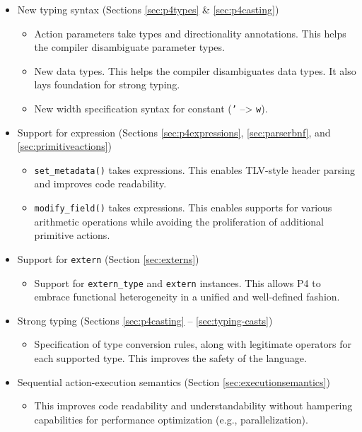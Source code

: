 \documentclass[12pt]{article}
\begin{document}
\begin{itemize}

\item New typing syntax (Sections \ref{sec:p4types} \& \ref{sec:p4casting})
  \begin{itemize}
  \item Action parameters take types and directionality annotations. 
  This helps the compiler disambiguate parameter types.
  \item New data types. This helps the compiler disambiguates data types. 
  It also lays foundation for strong typing.
  \item New width specification syntax for constant (\texttt{'} --> \texttt{w}).
  \end{itemize}

\item Support for expression (Sections \ref{sec:p4expressions}, 
\ref{sec:parserbnf}, and \ref{sec:primitiveactions})
  \begin{itemize}
  \item \texttt{set_metadata()} takes expressions. 
  This enables TLV-style header parsing and improves code readability.
  \item \texttt{modify_field()} takes expressions. 
  This enables supports for various arithmetic operations while avoiding
  the proliferation of additional primitive actions.
  \end{itemize}

\item Support for \texttt{extern} (Section \ref{sec:externs})
  \begin{itemize}
  \item Support for \texttt{extern_type} and \texttt{extern} instances.
  This allows P4 to embrace functional heterogeneity in a unified and well-defined
  fashion.
  \end{itemize}

\item Strong typing (Sections \ref{sec:p4casting} -- \ref{sec:typing-casts})
  \begin{itemize}
  \item Specification of type conversion rules, along with legitimate operators 
  for each supported type. This improves the safety of the language.
  \end{itemize}

\item Sequential action-execution semantics (Section \ref{sec:executionsemantics})
  \begin{itemize}
  \item This improves code readability and understandability without 
  hampering capabilities for performance optimization (e.g., parallelization).
  \end{itemize}


\end{itemize}
\end{document}
